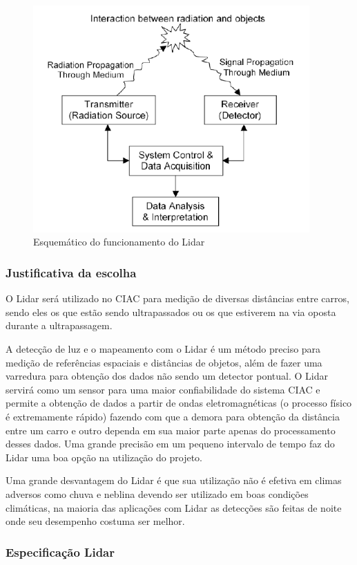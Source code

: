 \begin{figure}[h]
  \centering
  \includegraphics[width=400px, scale=1]{figuras/funcionamento_lidar}
  \caption{Esquemático do funcionamento do Lidar}
\label{fig:funcionamento_lidar}
\end{figure}

\subsubsection{Justificativa da escolha}
O Lidar será utilizado no CIAC para medição de diversas distâncias entre carros,
sendo eles os que estão sendo ultrapassados ou os que estiverem na via oposta
durante a ultrapassagem.

	A detecção de luz e o mapeamento com o Lidar é um método preciso para medição
  de referências espaciais e distâncias de objetos, além de fazer uma varredura
  para obtenção dos dados não sendo um detector pontual. O Lidar servirá como um
  sensor para uma maior confiabilidade do sistema CIAC e permite a obtenção de dados
  a partir de ondas eletromagnéticas (o processo físico é extremamente rápido)
  fazendo com que a demora para obtenção da distância entre um carro e outro
  dependa em sua maior parte apenas do processamento desses dados. Uma grande
  precisão em um pequeno intervalo de tempo faz do Lidar uma boa opção
  na utilização do projeto.

	Uma grande desvantagem do Lidar é que sua utilização não é efetiva em
  climas adversos como chuva e neblina devendo ser utilizado em boas condições
  climáticas, na maioria das aplicações com Lidar as detecções são feitas
  de noite onde seu desempenho costuma ser melhor.

\subsubsection{Especificação Lidar}

